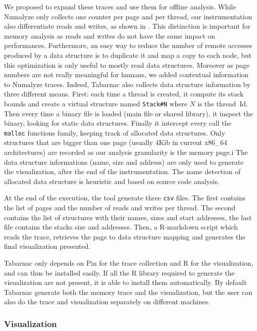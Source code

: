 We proposed to expand these traces and use them for offline analysis.
While \gls{Numalyze} only collects one counter per page and per thread, our instrumentation also differentiate reads and writes, as shown in .
This distinction is important for memory analysis as reads and writes do not have the same impact on performances.
Furthermore, an easy way to reduce the number of remote accesses produced by a data structure is to duplicate it and map a copy to each node, but this optimization is only useful to mostly read data structures.
Moreover as page numbers are not really meaningful for humans, we added contextual information to \gls{Numalyze} traces.
Indeed, \gls{Tabarnac} also collects data structure information by three different means.
First: each time a thread is created, it compute its stack bounds and create a virtual structure named \texttt{Stack\#N} where $N$ is the thread~Id.
Then every time a binary file is loaded (main file or shared library), it inspect the binary, looking for static data structures.
Finally it intercept every call the \texttt{malloc} functions family, keeping track of allocated data structures.
Only structures that are bigger than one page (usually $4$Kib in current x86\_64 architectures) are recorded as our analysis granularity is the memory page.i
The data structure informations (name, size and address) are only used to generate the visualization, after the end of the instrumentation.
The name detection of allocated data structure is heuristic and based on source code analysis.

At the end of the execution, the tool generate three \texttt{csv} files.
The first contains the list of pages and the number of reads and writes per thread.
The second contains the list of structures with their names, sizes and start addresses, the last file contains the stacks size and addresses.
Then, a \gls{R-markdown} script which reads the trace, retrieves the page to data structure mapping and generates the final visualization presented.

\gls{Tabarnac} only depends on \gls{Pin} for the trace collection and \gls{R} for the visualization, and can thus be installed easily.
If all the R library required to generate the visualization are not present, it is able to install them automatically.
By default \gls{Tabarnac} generate both the memory trace and the visualization, but the user can also do the trace and visualization separately on different machines.

\subsubsection{Visualization}

